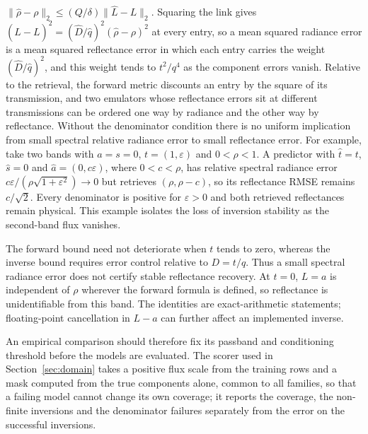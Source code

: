 $\|\widehat\rho-\rho\|_2\le(Q/\delta)\|\widehat L-L\|_2$.
Squaring the link gives $(\widehat L-L)^2=(\widehat D/\widehat q)^2(\widehat\rho-\rho)^2$ at every entry, so a mean
squared radiance error is a mean squared reflectance error in which each entry carries the weight
$(\widehat D/\widehat q)^2$, and this weight tends to $t^2/q^4$ as the component errors vanish. Relative to the
retrieval, the forward metric discounts an entry by the square of its transmission, and two emulators whose
reflectance errors sit at different transmissions can be ordered one way by radiance and the other way by
reflectance.
Without the denominator condition there is no uniform implication from small spectral
relative radiance error to small reflectance error. For example, take two bands with
$a=s=0$, $t=(1,\varepsilon)$ and $0<\rho<1$. A predictor with
$\widehat t=t$, $\widehat s=0$ and $\widehat a=(0,c\varepsilon)$, where $0<c<\rho$,
has relative spectral radiance error
$c\varepsilon/(\rho\sqrt{1+\varepsilon^2})\to0$ but retrieves
$(\rho,\rho-c)$, so its reflectance RMSE remains $c/\sqrt2$. Every denominator is
positive for $\varepsilon>0$ and both retrieved reflectances remain physical. This example isolates the loss of inversion stability as the second-band flux vanishes.

The forward bound need not deteriorate when $t$ tends to zero, whereas the inverse bound
requires error control relative to $D=t/q$. Thus a small spectral radiance error does not
certify stable reflectance recovery. At $t=0$, $L=a$ is independent of $\rho$ wherever the
forward formula is defined, so reflectance is unidentifiable from this band. The identities
are exact-arithmetic statements; floating-point cancellation in $L-a$ can further affect an
implemented inverse.

An empirical comparison should therefore fix its passband and conditioning threshold before
the models are evaluated. The scorer used in Section~\ref{sec:domain} takes a positive flux
scale from the training rows and a mask computed from the true components alone, common to all
families, so that a failing model cannot change its own coverage; it reports the coverage, the
non-finite inversions and the denominator failures separately from the error on the successful
inversions.
